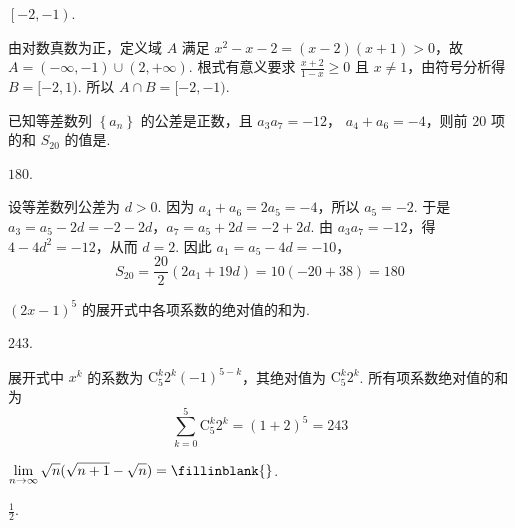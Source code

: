 \documentclass[UTF8,a4paper,oneside,11pt]{ctexbook}
\begin{document}
\begin{answer}
\(\left[-2,-1\right) \).
\end{answer}

\begin{solution}
由对数真数为正，定义域 \(A\) 满足 \(x^2-x-2=(x-2)(x+1)>0\)，故 \(A=(-\infty,-1)\cup(2,+\infty)\). 根式有意义要求 \(\frac{x+2}{1-x}\geq0\) 且 \(x\ne1\)，由符号分析得 \(B=[-2,1)\). 所以 \(A\cap B=[-2,-1)\).
\end{solution}

\begin{problem}

已知等差数列 \(\left\{a_{n}\right\} \) 的公差是正数，且 \(a_{3} a_{7} = -12 \)， \(a_{4} + a_{6} = -4 \)，则前 \(20\) 项的和 \(S_{20}\) 的值是\fillinblank{}.
\end{problem}

\begin{answer}
\(180\).
\end{answer}

\begin{solution}
设等差数列公差为 \(d>0\). 因为 \(a_4+a_6=2a_5=-4\)，所以 \(a_5=-2\). 于是 \(a_3=a_5-2d=-2-2d\)，\(a_7=a_5+2d=-2+2d\). 由 \(a_3a_7=-12\)，得 \(4-4d^2=-12\)，从而 \(d=2\). 因此 \(a_1=a_5-4d=-10\)，
\[
S_{20}=\frac{20}{2}\left(2a_1+19d\right)=10(-20+38)=180
\]
\end{solution}

\begin{problem}

\((2x-1)^{5} \) 的展开式中各项系数的绝对值的和为\fillinblank{}.
\end{problem}

\begin{answer}
\(243\).
\end{answer}

\begin{solution}
展开式中 \(x^k\) 的系数为 \(\mathrm C_5^k2^k(-1)^{5-k}\)，其绝对值为 \(\mathrm C_5^k2^k\). 所有项系数绝对值的和为
\[
\sum_{k=0}^{5}\mathrm C_5^k2^k=(1+2)^5=243
\]
\end{solution}

\begin{problem}

\(\displaystyle\lim_{n\to\infty}\sqrt{n}(\sqrt{n+1}-\sqrt{n})=\fillinblank{}\).
\end{problem}

\begin{answer}
\(\frac{1}{2} \).
\end{answer}
\end{document}
